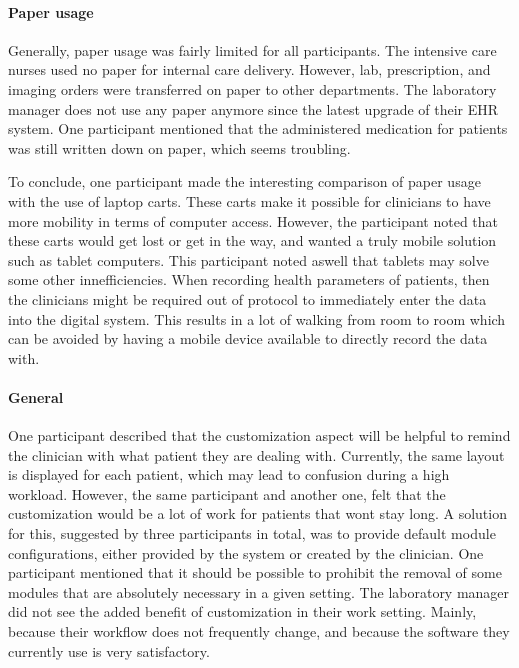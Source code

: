     \paragraph{Paper usage}

    Generally, paper usage was fairly limited for all participants. The intensive care nurses used no paper for internal care delivery. However, lab, prescription, and imaging orders were transferred on paper to other departments. The laboratory manager does not use any paper anymore since the latest upgrade of their EHR system. One participant mentioned that the administered medication for patients was still written down on paper, which seems troubling.

    To conclude, one participant made the interesting comparison of paper usage with the use of laptop carts. These carts make it possible for clinicians to have more mobility in terms of computer access. However, the participant noted that these carts would get lost or get in the way, and wanted a truly mobile solution such as tablet computers. This participant noted aswell that tablets may solve some other innefficiencies. When recording health parameters of patients, then the clinicians might be required out of protocol to immediately enter the data into the digital system. This results in a lot of walking from room to room which can be avoided by having a mobile device available to directly record the data with.
    
    \paragraph{General}
    
    One participant described that the customization aspect will be helpful to remind the clinician with what patient they are dealing with. Currently, the same layout is displayed for each patient, which may lead to confusion during a high workload. However, the same participant and another one, felt that the customization would be a lot of work for patients that wont stay long. A solution for this, suggested by three participants in total, was to provide default module configurations, either provided by the system or created by the clinician. One participant mentioned that it should be possible to prohibit the removal of some modules that are absolutely necessary in a given setting. The laboratory manager did not see the added benefit of customization in their work setting. Mainly, because their workflow does not frequently change, and because the software they currently use is very satisfactory.